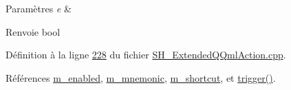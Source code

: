 \begin{DoxyParams}{Paramètres}
{\em e} & \\
\hline
\end{DoxyParams}
\begin{DoxyReturn}{Renvoie}
bool 
\end{DoxyReturn}


Définition à la ligne \hyperlink{SH__ExtendedQQmlAction_8cpp_source_l00228}{228} du fichier \hyperlink{SH__ExtendedQQmlAction_8cpp_source}{S\-H\-\_\-\-Extended\-Q\-Qml\-Action.\-cpp}.



Références \hyperlink{classSH__ExtendedQQmlAction_ad93920806001da9e32b7b2a3d3d9213e}{m\-\_\-enabled}, \hyperlink{classSH__ExtendedQQmlAction_a7c924c07aa50a7228b6e8f31c4520896}{m\-\_\-mnemonic}, \hyperlink{classSH__ExtendedQQmlAction_ac84d3a2113efb715321b905580b08bc5}{m\-\_\-shortcut}, et \hyperlink{classSH__ExtendedQQmlAction_abf79bb6cb923d27e2fc5dfc05ff513c2}{trigger()}.


